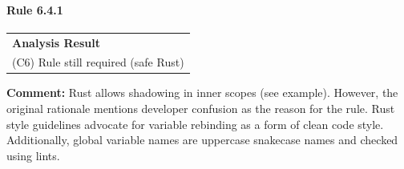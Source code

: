\paragraph{Rule 6.4.1}
\begin{longtable}{p{13cm}}
\textbf{Analysis Result} \\
(C6) Rule still required (safe Rust) \\
\end{longtable}
\textbf{Comment:} Rust allows shadowing in inner scopes (see example). However, the original rationale mentions developer confusion as the reason for the rule. Rust style guidelines advocate for variable rebinding as a form of clean code style. Additionally, global variable names are uppercase snakecase names and checked using lints. \\


